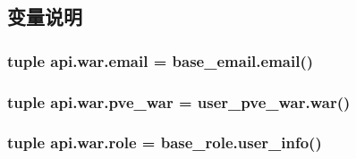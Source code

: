 \subsection{变量说明}
\hypertarget{namespaceapi_1_1war_af9485067edcb8ab2a1319223851a5535}{
\subsubsection[{email}]{\setlength{\rightskip}{0pt plus 5cm}tuple api.\-war.\-email = base\-\_\-email.\-email()}}\label{namespaceapi_1_1war_af9485067edcb8ab2a1319223851a5535}
\hypertarget{namespaceapi_1_1war_acf4f0adf976d198c5eac411d9d5bbbe5}{
\subsubsection[{pve\-\_\-war}]{\setlength{\rightskip}{0pt plus 5cm}tuple api.\-war.\-pve\-\_\-war = user\-\_\-pve\-\_\-war.\-war()}}\label{namespaceapi_1_1war_acf4f0adf976d198c5eac411d9d5bbbe5}
\hypertarget{namespaceapi_1_1war_ae54fd1efdd0587ecbd6a788b662d497a}{
\subsubsection[{role}]{\setlength{\rightskip}{0pt plus 5cm}tuple api.\-war.\-role = base\-\_\-role.\-user\-\_\-info()}}\label{namespaceapi_1_1war_ae54fd1efdd0587ecbd6a788b662d497a}
